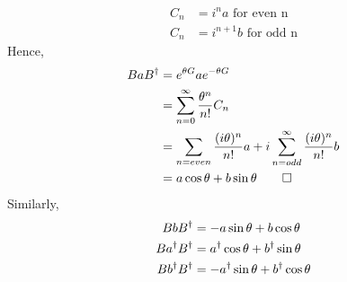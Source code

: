 \begin{align*}
C_n &= i^na \text{ for even n}\\
C_n &= i^{n+1}b \text{ for odd n}
\end{align*}
Hence,
\begin{align}
BaB^\dagger &= e^{\theta G}ae^{-\theta G}\\
&= \sum\limits_{n=0}^\infty \frac{\theta^n}{n!}C_n\\
&= \sum\limits_{n = even} \frac{(i\theta)^n}{n!}a + i\sum\limits_{n = odd}^\infty \frac{(i\theta)^n}{n!}b\\
&= a\cos\theta + b\sin\theta \qed
\end{align}
Similarly, 
\begin{align}
BbB^\dagger &= -a\sin\theta + b\cos\theta\\
Ba^\dagger B^\dagger &= a^\dagger\cos\theta + b^\dagger\sin\theta\\
Bb^\dagger B^\dagger &= -a^\dagger\sin\theta + b^\dagger\cos\theta
\end{align}
